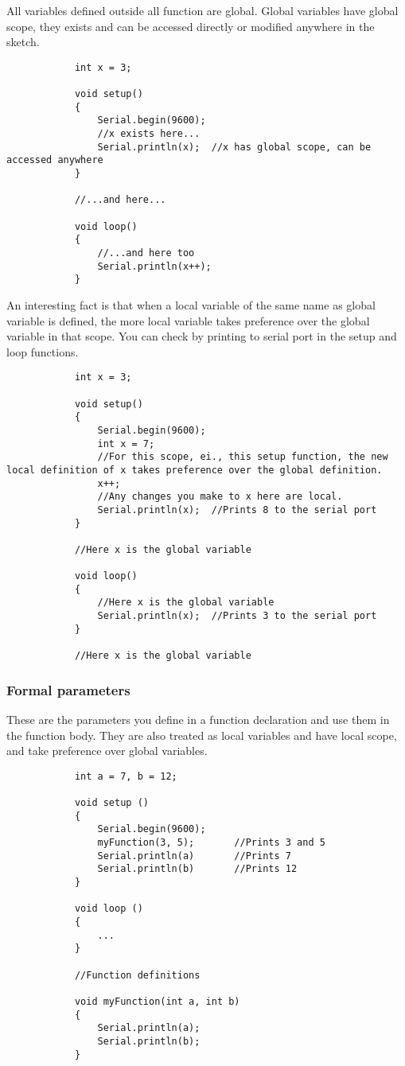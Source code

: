 \documentclass{article}
\begin{document}
			All variables defined outside all function are global. Global variables have global scope, they exists and can be accessed directly or modified anywhere in the sketch.

			\begin{lstlisting}
			int x = 3;

			void setup()
			{
				Serial.begin(9600);
				//x exists here...
				Serial.println(x);	//x has global scope, can be accessed anywhere
			}

			//...and here...

			void loop()
			{
				//...and here too
				Serial.println(x++);
			}
			\end{lstlisting}

			An interesting fact is that when a local variable of the same name as global variable is defined, the more local variable takes preference over the global variable in that scope. You can check by printing  to serial port in the setup and loop functions.

			\begin{lstlisting}
			int x = 3;

			void setup()
			{
				Serial.begin(9600);
				int x = 7;
				//For this scope, ei., this setup function, the new local definition of x takes preference over the global definition.
				x++;
				//Any changes you make to x here are local.
				Serial.println(x);	//Prints 8 to the serial port
			}

			//Here x is the global variable

			void loop()
			{
				//Here x is the global variable
				Serial.println(x);	//Prints 3 to the serial port
			}

			//Here x is the global variable
			\end{lstlisting}

		\subsubsection{Formal parameters}

			These are the parameters you define in a function declaration and use them in the function body. They are also treated as local variables and have local scope, and take preference over global variables.

			\begin{lstlisting}
			int a = 7, b = 12;

			void setup ()
			{
				Serial.begin(9600);
				myFunction(3, 5);		//Prints 3 and 5
				Serial.println(a)		//Prints 7
				Serial.println(b)		//Prints 12
			}

			void loop ()
			{
				...
			}

			//Function definitions

			void myFunction(int a, int b)
			{
				Serial.println(a);
				Serial.println(b);
			}

			
			\end{lstlisting}
				
\end{document}
